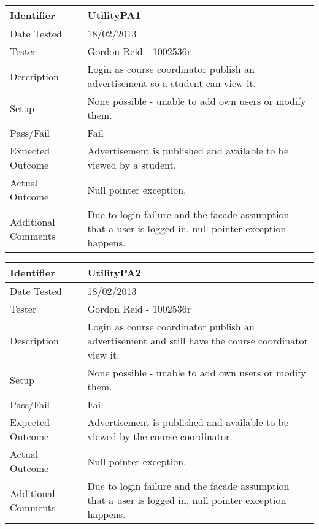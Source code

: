 \begin{tabularx}{\textwidth}{|T|L|}
\hline
Identifier & UtilityPA1\\
\hline
Date Tested & 18/02/2013\\
\hline
Tester & Gordon Reid - 1002536r\\
\hline
Description & Login as course coordinator publish an advertisement so a 
student can view it.\\
\hline
Setup & None possible - unable to add own users or modify them.\\
\hline
Pass/Fail & Fail\\
\hline
Expected Outcome & Advertisement is published and available to be viewed by
a student.\\
\hline
Actual Outcome & Null pointer exception.\\
\hline
Additional Comments & Due to login failure and the facade assumption that a user 
is logged in, null pointer exception happens.\\
\hline
\end{tabularx}

\vspace{2em}

\begin{tabularx}{\textwidth}{|T|L|}
\hline
Identifier & UtilityPA2\\
\hline
Date Tested & 18/02/2013\\
\hline
Tester & Gordon Reid - 1002536r\\
\hline
Description & Login as course coordinator publish an advertisement and still
have the course coordinator view it.\\
\hline
Setup & None possible - unable to add own users or modify them.\\
\hline
Pass/Fail & Fail\\
\hline
Expected Outcome & Advertisement is published and available to be viewed by the
course coordinator.\\
\hline
Actual Outcome & Null pointer exception.\\
\hline
Additional Comments & Due to login failure and the facade assumption that a user 
is logged in, null pointer exception happens.\\
\hline
\end{tabularx}

\vspace{2em}


